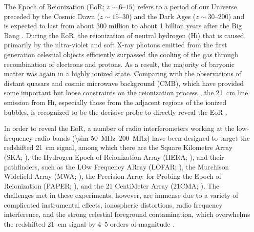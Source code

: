 \documentclass[modern]{aastex62}
\newcommand{\Hi}{H\textsc{i}}
\begin{document}
The Epoch of Reionization (EoR; $z \sim \numrange{6}{15}$) refers to
a period of our Universe preceded by the Cosmic Dawn
($z \sim \numrange{15}{30}$) and the Dark Ages ($z \sim \numrange{30}{200}$)
and is expected to last from about 300 million to about 1 billion years
after the Big Bang \citep[see][and references therein]{koopmans2015rev}.
During the EoR, the reionization of
neutral hydrogen (\Hi) that is caused primarily by the ultra-violet and
soft X-ray photons emitted from the first generation celestial objects
efficiently surpassed the cooling of the gas through
recombination of electrons and protons.
As a result, the majority of baryonic matter was again in a
highly ionized state.
Comparing with the observations of distant quasars and cosmic microwave
background (CMB), which have provided some important but loose
constraints on the reionization process \citep[see][for a review]{fan2006rev},
the 21~cm line emission from \Hi{}, especially those from the adjacent
regions of the ionized bubbles, is recognized to be the decisive probe
to directly reveal the EoR
\citep[see][for reviews]{furlanetto2006rev,zaroubi2013rev,furlanetto2016rev}.

In order to reveal the EoR, a number of radio interferometers working
at the low-frequency radio bands (\SIrange{\sim 50}{200}{\MHz}) have been
designed to target the redshifted 21~cm signal, among which there are
the Square Kilometre Array (SKA; \citealt{mellema2013rev,koopmans2015rev}),
the Hydrogen Epoch of Reionization Array (HERA; \citealt{deboer2017}),
and their pathfinders, such as
the LOw Frequency ARray (LOFAR; \citealt{vanHaarlem2013}),
the Murchison Widefield Array (MWA; \citealt{bowman2013,tingay2013}),
the Precision Array for Probing the Epoch of Reionization
(PAPER; \citealt{parsons2010}),
and the 21 CentiMeter Array (21CMA; \citealt{zheng2016}).
The challenges met in these experiments, however, are immense
due to a variety of complicated instrumental effects,
ionospheric distortions, radio frequency interference, and the
strong celestial foreground contamination, which overwhelms the
redshifted 21~cm signal by \numrange{4}{5} orders of magnitude
\citep[see][for a review]{morales2010rev}.
\end{document}
